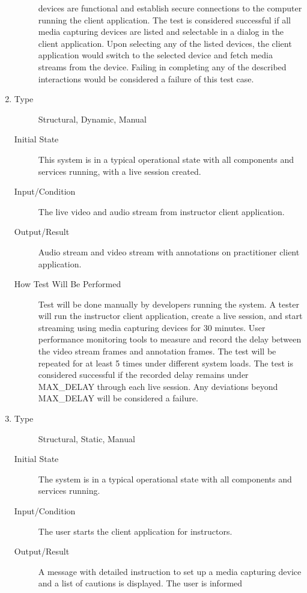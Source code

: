 \documentclass[12pt, titlepage]{article}
\begin{document}
\begin{enumerate}[NFR-T1]
\begin{description}
    devices are functional and establish secure connections to the computer
    running the client application. The test is considered successful if all
    media capturing devices are listed and selectable in a dialog in the client
    application. Upon selecting any of the listed devices, the client
    application would switch to the selected device and fetch media streams from
    the device. Failing in completing any of the described interactions would be
    considered a failure of this test case.
  \end{description}
\item \label{NFRT14}
  \begin{description}
  \item[Type] Structural, Dynamic, Manual
  \item[Initial State] This system is in a typical operational state with all
    components and services running, with a live session created.
  \item[Input/Condition] The live video and audio stream from instructor client
    application.
  \item[Output/Result] Audio stream and video stream with annotations on
    practitioner client application.
  \item[How Test Will Be Performed] Test will be done manually by developers
    running the system. A tester will run the instructor client application,
    create a live session, and start streaming using media capturing devices for
    30 minutes. User performance monitoring tools to measure and record the
    delay between the video stream frames and annotation frames. The test will
    be repeated for at least 5 times under different system loads. The test is
    considered successful if the recorded delay remains under MAX\_DELAY
    through each live session. Any deviations beyond MAX\_DELAY will be
    considered a failure.
  \end{description}
\item \label{NFRT15}
  \begin{description}
  \item[Type] Structural, Static, Manual
  \item[Initial State] The system is in a typical operational state with all
    components and services running.
  \item[Input/Condition] The user starts the client application for instructors.
  \item[Output/Result] A message with detailed instruction to set up a media
    capturing device and a list of cautions is displayed. The user is informed

\end{description}
\end{enumerate}
\end{document}
